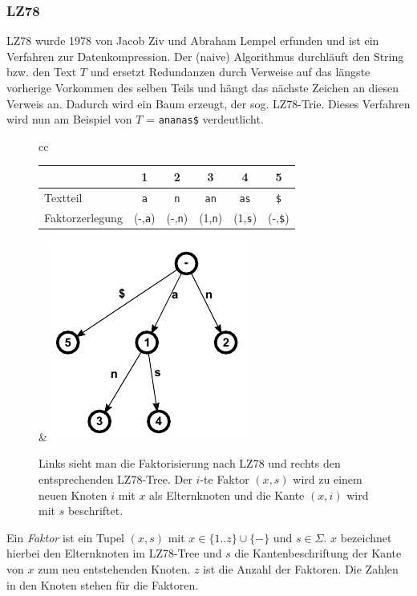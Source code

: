 \documentclass[a4paper,11pt]{scrartcl}%
\theoremstyle{change}
\theoremstyle{nonumberplain}
\theoremstyle{change}
\theoremstyle{nonumberplain}
\theoremstyle{change}
\theoremstyle{nonumberplain}
\begin{document}
	\subsubsection{LZ78}
	LZ78 wurde 1978 von Jacob Ziv und Abraham Lempel erfunden und ist ein Verfahren zur Datenkompression. Der (naive) Algorithmus durchläuft den String bzw. den Text $T$ und ersetzt Redundanzen durch Verweise auf das längste vorherige Vorkommen des selben Teils und hängt das nächste Zeichen an diesen Verweis an. Dadurch wird ein Baum erzeugt, der sog. LZ78-Trie. Dieses Verfahren wird nun am Beispiel von $T$ = \texttt{ananas\$} verdeutlicht.
	\begin{figure}[h]
	\begin{tabular}[t]{cc}
		\begin{tabular}[b]{l c c c c c}\hline
			& 1 & 2 & 3 & 4 & 5 \\ \hline
		   Textteil & \texttt{a} & \texttt{n} & \texttt{an} & \texttt{as} & \texttt{\$}\\ \hline
		   Faktorzerlegung & (-,\texttt{a}) & (-,\texttt{n}) & (1,\texttt{n}) & (1,\texttt{s}) &  (-,\texttt{\$})\\ \hline
		\end{tabular} & \includegraphics{ananas_LZ78Tree}
	\end{tabular}
	\caption{Links sieht man die Faktorisierung nach LZ78 und rechts den entsprechenden LZ78-Tree. Der $i$-te Faktor $(x,s)$ wird zu einem neuen Knoten $i$ mit $x$ als Elternknoten und die Kante $(x,i)$ wird mit $s$ beschriftet.}
	\label{fig:lz78}
	\end{figure}
	
	Ein \textit{Faktor} ist ein Tupel $(x,s)$ mit $x \in \{1..z\} \cup \{-\}$ und $s \in \Sigma$. $x$ bezeichnet hierbei den Elternknoten im LZ78-Tree und $s$ die Kantenbeschriftung der Kante von $x$ zum neu entstehenden Knoten. $z$ ist die Anzahl der Faktoren. Die Zahlen in den Knoten stehen für die Faktoren. 
	
\end{document}
